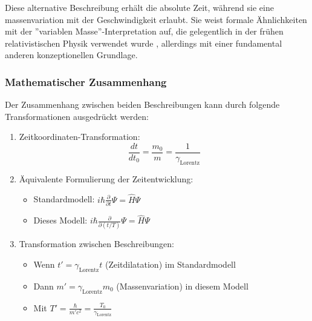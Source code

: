\documentclass[a4paper,12pt]{article}
\newcommand{\Tzero}{T_0}
\newcommand{\gammaf}{\gamma_{\text{Lorentz}}}
\begin{document}
	Diese alternative Beschreibung erhält die absolute Zeit, während sie eine massenvariation mit der Geschwindigkeit erlaubt. Sie weist formale Ähnlichkeiten mit der ''variablen Masse''-Interpretation auf, die gelegentlich in der frühen relativistischen Physik verwendet wurde \cite{Tolman1917}, allerdings mit einer fundamental anderen konzeptionellen Grundlage.
	
	\subsubsection{Mathematischer Zusammenhang}
	Der Zusammenhang zwischen beiden Beschreibungen kann durch folgende Transformationen ausgedrückt werden:
	\begin{enumerate}
		\item Zeitkoordinaten-Transformation:
		\[
		\frac{dt}{dt_0} = \frac{m_0}{m} = \frac{1}{\gammaf}
		\]
		\item Äquivalente Formulierung der Zeitentwicklung:
		\begin{itemize}
			\item Standardmodell: $i\hbar\frac{\partial}{\partial t}\Psi = \hat{H}\Psi$
			\item Dieses Modell: $i\hbar\frac{\partial}{\partial (t/T)}\Psi = \hat{H}\Psi$
		\end{itemize}
		\item Transformation zwischen Beschreibungen:
		\begin{itemize}
			\item Wenn $t' = \gammaf t$ (Zeitdilatation) im Standardmodell
			\item Dann $m' = \gammaf m_0$ (Massenvariation) in diesem Modell
			\item Mit $T' = \frac{\hbar}{m'c^2} = \frac{\Tzero}{\gammaf}$
		\end{itemize}
	\end{enumerate}
	
\end{document}
